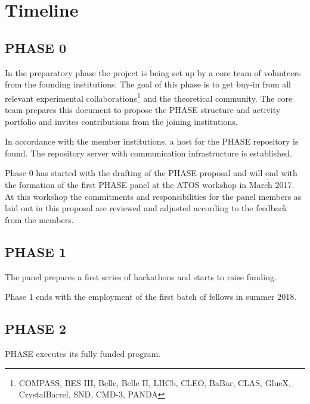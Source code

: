 \section{Timeline}

\subsection{PHASE 0}
In the preparatory phase the project is being set up by a core team of volunteers from the founding institutions. The goal of this phase is to get buy-in from all relevant
experimental collaborations\footnote{COMPASS, BES III, Belle, Belle II, LHCb, CLEO, BaBar, CLAS, GlueX, CrystalBarrel, SND, CMD-3, PANDA} and the theoretical community.  The core team prepares this document to propose the PHASE structure and activity portfolio and invites contributions from the joining institutions.

In accordance with the member institutions, a host for the PHASE repository is found. The repository server with communication infrastructure is established.

Phase 0 has started with the drafting of the PHASE proposal and will end with the formation of the first PHASE panel at the ATOS workshop in March 2017. At this workshop the commitments and responsibilities for the panel members as laid out in this proposal are reviewed and adjusted according to the feedback from the members.

\subsection{PHASE 1}
The panel prepares a first series of hackathons and starts to raise funding.

Phase 1 ends with the employment of the first batch of fellows in summer 2018.
\subsection{PHASE 2}
PHASE executes its fully funded program.